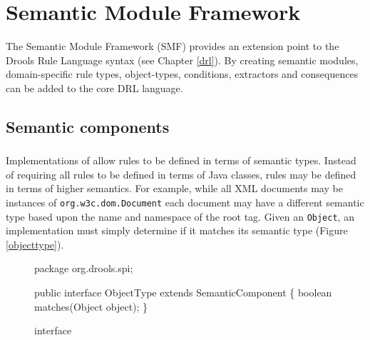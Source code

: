 \chapter{Semantic Module Framework}
\label{smf}

The Semantic Module Framework (SMF)
provides an extension point to the Drools Rule Language syntax
(see Chapter \vref{drl}).  By creating semantic modules,
domain-specific rule types, object-types, conditions, extractors and consequences
can be added to the core DRL language.

\section{Semantic components}

\subsection{}

\subsection{}

Implementations of  allow rules to be
defined in terms of semantic types. Instead of requiring all
rules to be defined in terms of Java classes, rules may be
defined in terms of higher semantics.  For example, while
all XML documents may be instances of \texttt{org.w3c.dom.Document}
each document may have a different semantic type based upon
the name and namespace of the root tag.  Given an \texttt{Object},
an  implementation must simply determine
if it matches its semantic type (Figure \vref{objecttype}).

\begin{figure}
\begin{javaCodelisting}
package org.drools.spi;

public interface ObjectType
    extends SemanticComponent
\{
    boolean matches(Object object);
\}
\end{javaCodelisting}
\caption{ interface}
\label{objecttype}
\end{figure}

\subsubsection{}

